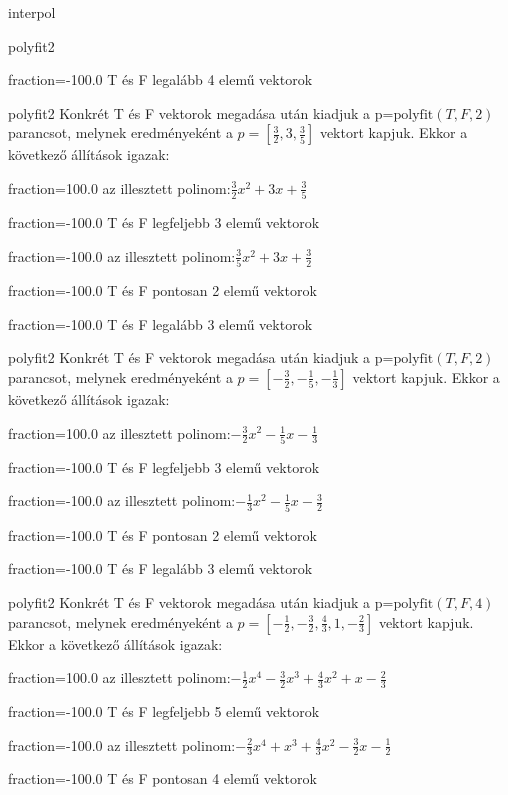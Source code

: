 \documentclass[12pt]{article}
\begin{document}
\begin{quiz}{interpol}
\begin{multi}[multiple]{polyfit2}
\item[fraction=-100.0] T és F legalább 4 elemű vektorok
\end{multi}
\begin{multi}[multiple]{polyfit2}
Konkrét T és F vektorok megadása után kiadjuk a p=$\mathrm{polyfit}(T,F,2)$
parancsot, melynek eredményeként a $p=\left[\frac{3}{2},3,\frac{3}{5}\right]$ vektort kapjuk.
Ekkor a következő állítások igazak:
\item[fraction=100.0] az illesztett polinom:$\frac{3}{2}x^2+3x+\frac{3}{5}$
\item[fraction=-100.0]  T és F legfeljebb 3 elemű vektorok
\item[fraction=-100.0]  az illesztett polinom:$\frac{3}{5}x^2+3x+\frac{3}{2}$
\item[fraction=-100.0]  T és F pontosan 2 elemű vektorok
\item[fraction=-100.0] T és F legalább 3 elemű vektorok
\end{multi}
\begin{multi}[multiple]{polyfit2}
Konkrét T és F vektorok megadása után kiadjuk a p=$\mathrm{polyfit}(T,F,2)$
parancsot, melynek eredményeként a $p=\left[-\frac{3}{2},-\frac{1}{5},-\frac{1}{3}\right]$ vektort kapjuk.
Ekkor a következő állítások igazak:
\item[fraction=100.0] az illesztett polinom:$-\frac{3}{2}x^2-\frac{1}{5}x-\frac{1}{3}$
\item[fraction=-100.0]  T és F legfeljebb 3 elemű vektorok
\item[fraction=-100.0]  az illesztett polinom:$-\frac{1}{3}x^2-\frac{1}{5}x-\frac{3}{2}$
\item[fraction=-100.0]  T és F pontosan 2 elemű vektorok
\item[fraction=-100.0] T és F legalább 3 elemű vektorok
\end{multi}
\begin{multi}[multiple]{polyfit2}
Konkrét T és F vektorok megadása után kiadjuk a p=$\mathrm{polyfit}(T,F,4)$
parancsot, melynek eredményeként a $p=\left[-\frac{1}{2},-\frac{3}{2},\frac{4}{3},1,-\frac{2}{3}\right]$ vektort kapjuk.
Ekkor a következő állítások igazak:
\item[fraction=100.0] az illesztett polinom:$-\frac{1}{2}x^4-\frac{3}{2}x^3+\frac{4}{3}x^2+x-\frac{2}{3}$
\item[fraction=-100.0]  T és F legfeljebb 5 elemű vektorok
\item[fraction=-100.0]  az illesztett polinom:$-\frac{2}{3}x^4+x^3+\frac{4}{3}x^2-\frac{3}{2}x-\frac{1}{2}$
\item[fraction=-100.0]  T és F pontosan 4 elemű vektorok

\end{multi}
\end{quiz}
\end{document}
